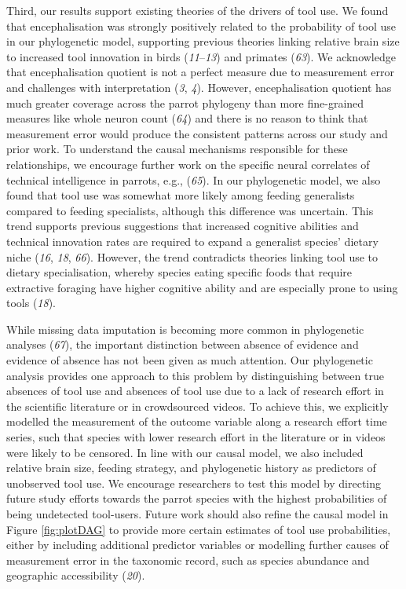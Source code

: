 \documentclass[
  man,floatsintext]{apa6}
\begin{document}
Third, our results support existing theories of the drivers of tool use. We
found that encephalisation was strongly positively related to the probability of
tool use in our phylogenetic model, supporting previous theories linking
relative brain size to increased tool innovation in birds (\emph{11}--\emph{13}) and primates (\emph{63}). We acknowledge that
encephalisation quotient is not a perfect measure due to measurement error and
challenges with interpretation (\emph{3}, \emph{4}). However, encephalisation
quotient has much greater coverage across the parrot phylogeny than more
fine-grained measures like whole neuron count (\emph{64}) and there is no reason
to think that measurement error would produce the consistent patterns across our
study and prior work. To understand the causal mechanisms responsible for these
relationships, we encourage further work on the specific neural correlates of
technical intelligence in parrots, e.g., (\emph{65}). In our phylogenetic
model, we also found that tool use was somewhat more likely among feeding
generalists compared to feeding specialists, although this difference was
uncertain. This trend supports previous suggestions that increased cognitive
abilities and technical innovation rates are required to expand a generalist
species' dietary niche (\emph{16}, \emph{18}, \emph{66}). However, the trend contradicts theories linking tool use to
dietary specialisation, whereby species eating specific foods that require
extractive foraging have higher cognitive ability and are especially prone to
using tools (\emph{18}).

While missing data imputation is becoming more common in phylogenetic
analyses (\emph{67}), the important distinction between absence of
evidence and evidence of absence has not been given as much attention. Our
phylogenetic analysis provides one approach to this problem by distinguishing
between true absences of tool use and absences of tool use due to a lack of
research effort in the scientific literature or in crowdsourced videos. To
achieve this, we explicitly modelled the measurement of the outcome variable
along a research effort time series, such that species with lower research
effort in the literature or in videos were likely to be censored. In line with
our causal model, we also included relative brain size, feeding strategy, and
phylogenetic history as predictors of unobserved tool use. We encourage
researchers to test this model by directing future study efforts towards the
parrot species with the highest probabilities of being undetected tool-users.
Future work should also refine the causal model in Figure \ref{fig:plotDAG} to
provide more certain estimates of tool use probabilities, either by including
additional predictor variables or modelling further causes of measurement error
in the taxonomic record, such as species abundance and geographic
accessibility (\emph{20}).
\end{document}
